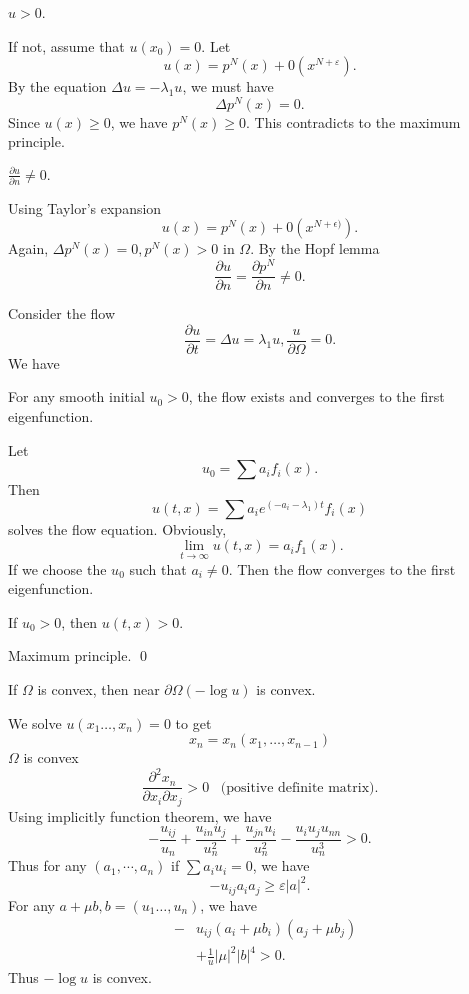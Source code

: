 \begin{lemma} $ u > 0 $.\end{lemma}

If not, assume that $ u (x_0) = 0 $. Let 
%
\[ u(x) = p^N (x) + 0 ( x ^{N+\varepsilon} ). \]
%
By the equation $ \Delta u = - \lambda_1 u $, we must have 
%
\[ \Delta p^N (x) = 0 .\]
%
Since $ u (x) \geq 0 $, we have $ p^N (x) \geq 0 $. This contradicts to the maximum principle.

\begin{lemma} 
$ \frac{\partial u}{\partial n} \neq 0. $
\end{lemma}

 Using Taylor's expansion
\[ u(x) = p ^N (x) + 0 ( x ^{N+ \epsilon)} ).\]
%
Again, $ \Delta p^N (x) = 0 , p^N (x) > 0 $ in $ \Omega $. By the Hopf lemma 
%
\[ \frac{\partial u}{\partial n} = \frac{\partial p^N}{\partial n} \neq 0. \]

Consider the flow 
%
\[ \frac{\partial u}{\partial t} = \Delta u = \lambda _1 u, \frac{u}{\partial \Omega} = 0 .\]
We have 
\begin{lemma} 
For any smooth initial $ u _0 > 0 $, the flow exists and converges to the first eigenfunction. 
\end{lemma}

Let 
%
\[ u_0 = \sum a _i f _i (x).\]
%
Then
%
\[ u ( t, x) = \sum a_i e ^{(-a_{i} -  \lambda _{1} )t} f_i (x) \]
%
solves the flow equation. Obviously,
%
\[ \lim_{t \rightarrow  \infty} u(t, x) =  a _i f_1 (x). \]
%
If  we choose the $u_0$ such that $ a _i \neq 0 $. Then the flow converges to the first eigenfunction.

\begin{lemma} If $ u_0 > 0 $, then $ u (t, x) >0 $.
\end{lemma}

 Maximum principle.
\qed

\begin{lemma} If $ \Omega$ is convex, then near $ \partial \Omega  (-\log u) $ is convex.
\end{lemma}
We solve $ u ( x_1 \ldots, x_n) = 0 $ to get 
%
\[ x _n = x_n (x _1 , \ldots , x _{n-1} ) \]
%
$ \Omega$ is convex 
%
\[ \frac{\partial ^ 2 x _n }{\partial x_i \partial x_j} > 0 \;\;\;\mbox{(positive definite matrix)}.\]
%
Using implicitly function theorem, we have 
%
\[ -\frac{u_{ij}}{u_n} + \frac{u_{in} u_j}{u^2_n} + \frac{u_{jn} u_i}{u^2_n} - \frac{u_i u_j u_{nn}}{u_n^3} > 0 .\]
%
Thus for any $ (a _1, \cdots , a_n) $ if $ \sum a _i u_i = 0 $, we have
%
\[ - u _{ij} a _i a_j \geq \varepsilon |a|^2.\]
%
For any $a + \mu b , b = (u _1 \ldots, u_n ) $, we have 
\begin{eqnarray*}
& - & u_{ij} (a_i + \mu b_i )( a_j + \mu b_j ) \\
&& + \frac{1}{u} |\mu | ^2 |b| ^4 > 0 .
\end{eqnarray*}
Thus $ - \log  u$ is convex.

